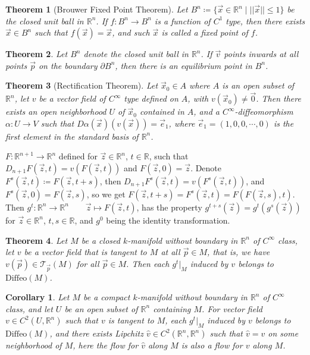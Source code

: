 \documentclass[9pt]{article}
\theoremstyle{break}
\theoremstyle{break}
\newtheorem{thm}{Theorem}[section]
\newtheorem{corT}[lem]{Corollary}
\newcommand{\R}{\mathbb{R}}
\newcommand{\T}{\mathcal{T}}
\begin{document}
\begin{thm}[Brouwer Fixed Point Theorem]
Let $B^n\coloneqq \{ \vec{x}\in \R^n \mid ||\vec{x}|| \leq 1 \}$ be the closed unit ball in $\R^n$. 
If $f:B^n \to B^n$ is a function of $C^1$ type, then there exists $\vec{x}\in B^n$ such that $f(\vec{x}) = \vec{x}$, and such $\vec{x}$ is called a fixed point of $f$. 
\end{thm}

\begin{thm}
Let $B^n$ denote the closed unit ball in $\R^n$. If $\vec{v}$ points inwards at all points $\vec{p}$ on the boundary $\partial B^n$, then there is an equilibrium point in $B^n$. 
\end{thm}

\begin{thm}[Rectification Theorem]
Let $\vec{x}_0 \in A$ where $A $ is an open subset of $\R^n$, let $v $ be a vector field of $C^\infty$ type defined on $A$, with $v(\vec{x}_0) \neq \vec{0}$. Then there exists an open neighborhood $U$ of $\vec{x}_0$ contained in $A$, and a $C^\infty$-diffeomorphism $\alpha:U\to V$ such that $D\alpha(\vec{x})(v(\vec{x})) = \vec{e}_1$, where $\vec{e}_1 = (1,0,0,\cdots, 0)$ is the first element in the standard basis of $\R^n$. 
\end{thm}

$F:\R^{n+1} \to \R^n$ defined for $\vec{z}\in \R^n$, $t \in \R$, such that $D_{n+1}F(\vec{z},t) = v(F(\vec{z},t))$ and $F(\vec{z},0) = \vec{z}$. Denote $F^s(\vec{z},t) \coloneqq F(\vec{z}, t+s)$, then $
D_{n+1} F^s(\vec{z},t) = v(F^s(\vec{z},t)) $, and $F^s(\vec{z},0) = F(\vec{z},s)$, so we get $F(\vec{z},t+s) = F^s(\vec{z},t) = F(F(\vec{z},s),t)$. Then $g^t:\R^n \to \R^n \qquad \vec{z}\mapsto F(\vec{z},t)$, has the property $g^{t+s}(\vec{z}) = g^t(g^s(\vec{z}))$ for $\vec{z}\in \R^n$, $t,s \in \R$, and $g^0$ being the identity transformation. 

\begin{thm}
Let $M$ be a closed $k$-manifold without boundary in $\R^n$ of $C^\infty$ class, let $v$ be a vector field that is tangent to $M$ at all $\vec{p}\in M$, that is, we have $v(\vec{p}) \in \T_{\vec{p}}(M)$ for all $\vec{p}\in M$. Then each $g^t|_M$ induced by $v$ belongs to $\text{Diffeo}(M)$.
\end{thm}

\begin{corT}
Let $M$ be a compact $k$-manifold without boundary in $\R^n$ of $C^\infty$ class, and let $U$ be an open subset of $\R^n$ containing $M$. For vector field $v \in C^2(U, \R^n)$ such that $v$ is tangent to $M$, each $g^t|_M$ induced by $v$ belongs to $\text{Diffeo}(M)$, and there exists Lipchitz $\hat{v} \in C^2(\R^n, \R^n)$ such that $\hat{v} = v$ on some neighborhood of $M$, here the flow for $\hat{v}$ along $M$ is also a flow for $v$ along $M$.
\end{corT}
\end{document}
